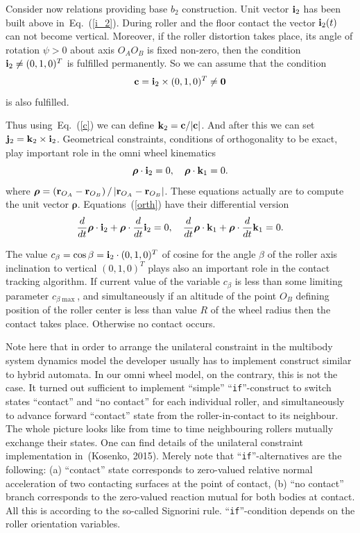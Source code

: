 \documentclass{jsme-tj}
\newcommand{\Frac}[2]{\frac{\displaystyle #1}{\displaystyle #2}}
\begin{document}
Consider now relations providing base $b_2$ construction. Unit vector 
${\bf i}_2$ has been built above in~Eq.~(\ref{i_2}). During roller and the 
floor contact the vector ${\bf i}_2(t)$ can not become vertical. Moreover, if 
the roller distortion takes place, its angle of rotation $\psi >0$ about axis 
$O_AO_B$ is fixed non-zero, then the condition ${\bf i}_2\ne (0,1,0)^T$ is 
fulfilled permanently. So we can assume that the condition
\begin{equation}
{\bf c}={\bf i}_2\times (0,1,0)^T\ne {\bf 0}\label{c}
\end{equation}
is also fulfilled.

Thus using~Eq.~(\ref{c}) we can define ${\bf k}_2={\bf c}/|{\bf c}|$. And after 
this we can set ${\bf j}_2={\bf k}_2\times {\bf i}_2$. Geometrical constraints, 
conditions of orthogonality to be exact, play important role in the omni wheel 
kinematics
\begin{equation}
\bm\rho\cdot {\bf i}_2=0,\quad\bm\rho\cdot {\bf k}_1=0.\label{orth}
\end{equation}
where $\bm\rho =\left( {\bf r}_{O_A}-{\bf r}_{O_B}\right) /
\left| {\bf r}_{O_A}-{\bf r}_{O_B}\right|$. These equations actually are to 
compute the unit vector $\bm\rho $. Equations~(\ref{orth}) have their 
differential version
\begin{equation}
\Frac{d}{dt}\bm\rho\cdot {\bf i}_2+\bm\rho\cdot\Frac{d}{dt}{\bf i}_2=0,\quad
\Frac{d}{dt}\bm\rho\cdot {\bf k}_1+\bm\rho\cdot\Frac{d}{dt}{\bf k}_1=0.
\end{equation}

The value $c_{\beta }=\cos\beta ={\bf i}_2\cdot (0,1,0)^T$ of cosine for the 
angle $\beta $ of the roller axis inclination to vertical $(0,1,0)^T$ plays 
also an important role in the contact tracking algorithm. If current value of
the variable $c_{\beta }$ is less than some limiting parameter 
$c_{\beta\max }$, and simultaneously if an altitude of the point $O_B$ defining
position of the roller center is less than value $R$ of the wheel radius then
the contact takes place. Otherwise no contact occurs.

Note here that in order to arrange the unilateral constraint in the multibody
system dynamics model the developer usually has to implement construct similar 
to hybrid automata. In our omni wheel model, on the contrary, this is not the 
case. It turned out sufficient to implement ``simple'' ``{\tt if}''-construct 
to switch states ``contact'' and ``no contact'' for each individual roller, and 
simultaneously to advance forward ``contact'' state from the roller-in-contact 
to its neighbour. The whole picture looks like from time to time neighbouring 
rollers mutually exchange their states. One can find details of the unilateral 
constraint implementation in~(Kosenko, 2015). Merely note that 
``{\tt if}''-alternatives are the following: (a) ``contact'' state corresponds 
to zero-valued relative normal acceleration of two contacting surfaces at the 
point of contact, (b) ``no contact'' branch corresponds to the zero-valued 
reaction mutual for both bodies at contact. All this is according to the 
so-called Signorini rule. ``{\tt if}''-condition depends on the roller 
orientation variables.
\end{document}
